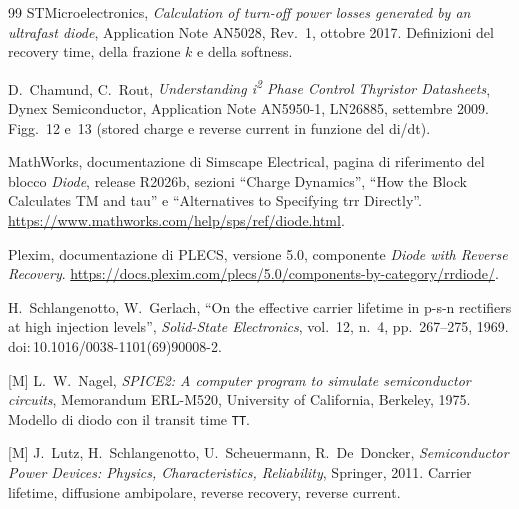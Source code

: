 \documentclass[10pt,a4paper]{scrartcl}
\begin{document}
\begin{thebibliography}{99}
STMicroelectronics, \emph{Calculation of turn-off power losses generated by an ultrafast diode}, Application Note AN5028, Rev.~1, ottobre 2017. Definizioni del recovery time, della frazione $k$ e della softness.

D.~Chamund, C.~Rout, \emph{Understanding i\textsuperscript{2} Phase Control Thyristor Datasheets}, Dynex Semiconductor, Application Note AN5950-1, LN26885, settembre 2009. Figg.~12 e~13 (stored charge e reverse current in funzione del di/dt).

MathWorks, documentazione di Simscape Electrical, pagina di riferimento del blocco \emph{Diode}, release R2026b, sezioni ``Charge Dynamics'', ``How the Block Calculates TM and tau'' e ``Alternatives to Specifying trr Directly''. \url{https://www.mathworks.com/help/sps/ref/diode.html}.

Plexim, documentazione di PLECS, versione 5.0, componente \emph{Diode with Reverse Recovery}. \url{https://docs.plexim.com/plecs/5.0/components-by-category/rrdiode/}.

H.~Schlangenotto, W.~Gerlach, ``On the effective carrier lifetime in p-s-n rectifiers at high injection levels'', \emph{Solid-State Electronics}, vol.~12, n.~4, pp.~267--275, 1969. doi:\,10.1016/0038-1101(69)90008-2.

[M] L.~W.~Nagel, \emph{SPICE2: A computer program to simulate semiconductor circuits}, Memorandum ERL-M520, University of California, Berkeley, 1975. Modello di diodo con il transit time \texttt{TT}.

[M] J.~Lutz, H.~Schlangenotto, U.~Scheuermann, R.~De~Doncker, \emph{Semiconductor Power Devices: Physics, Characteristics, Reliability}, Springer, 2011. Carrier lifetime, diffusione ambipolare, reverse recovery, reverse current.

\end{thebibliography}
\end{document}
